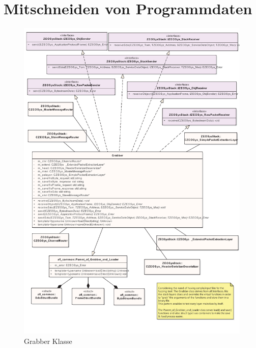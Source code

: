 \documentclass[12pt,a4paper]{scrreprt}
\begin{document}
\newpage
\section{Mitschneiden von Programmdaten}

\begin{figure}[htbp] 
  \centering
     \includegraphics[width=1.0\textwidth]{generate.pdf}
  \caption{Grabber Klasse}
  \label{fig:Bild1}
\end{figure}
\end{document}
